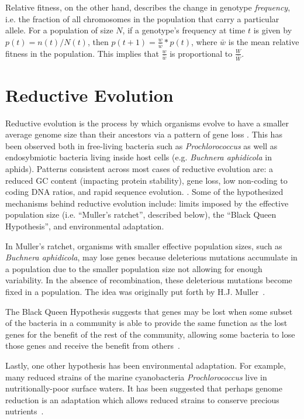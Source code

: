 Relative fitness, on the other hand, describes the change in genotype \textit{frequency}, i.e. the fraction of all chromosomes in the population that carry a particular allele. For a population of size $N$, if a genotype's frequency at time $t$ is given by $p(t) = n(t)/N(t)$, then $p(t+1) = \frac{w}{\bar{w}}*p(t)$, where $\bar{w}$ is the mean relative fitness in the population. This implies that $\frac{w}{\bar{w}}$ is proportional to $\frac{W}{\bar{W}}$. 

\section{Reductive Evolution}\label{reductive_evolution}
Reductive evolution is the process by which organisms evolve to have a smaller average genome size than their ancestors via a pattern of gene loss \cite{wilcox2003consequences}. This has been observed both in free-living bacteria such as \textit{Prochlorococcus} as well as endosybmiotic bacteria living inside host cells (e.g. \textit{Buchnera aphidicola} in aphids). Patterns consistent across most cases of reductive evolution are: a reduced GC content (impacting protein stability), gene loss, low non-coding to coding DNA ratios, and rapid sequence evolution.  \cite{Batut.2014}. Some of the hypothesized mechanisms behind reductive evolution include: limits imposed by the effective population size (i.e. ``Muller's ratchet'', described below), the ``Black Queen Hypothesis'', and environmental adaptation. 

In Muller's ratchet, organisms with smaller effective population sizes, such as \textit{Buchnera aphidicola}, may lose genes because deleterious mutations accumulate in a population due to the smaller population size not allowing for enough variability. In the absence of recombination, these deleterious mutations become fixed in a population. The idea was originally put forth by H.J. Muller~\cite{MullersRatchet}.


The Black Queen Hypothesis suggests that genes may be lost when some subset of the bacteria in a community is able to provide the same function as the lost genes for the benefit of the rest of the community, allowing some bacteria to lose those genes and receive the benefit from others~\cite{morris2012black}. 

Lastly, one other hypothesis has been environmental adaptation. For example, many reduced strains of the marine cyanobacteria \textit{Prochlorococcus} live in nutritionally-poor surface waters. It has been suggested that perhaps genome reduction is an adaptation which allows reduced strains to conserve precious nutrients~\cite{rocap2003genome, dufresne2005accelerated}. 



